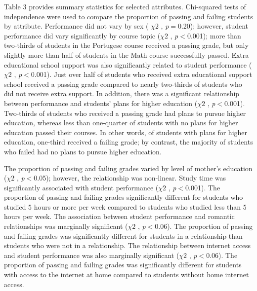 \documentclass[sigconf]{acmart}
\begin{document}
Table 3 provides summary statistics for selected attributes. Chi-squared tests 
of independence were used to compare the proportion of passing and failing 
students by attribute. Performance did not vary by sex ( $\chi 2$ , 
\textit{p}$=$0.20); however, student performance did vary significantly by 
course topic ($\chi 2$ , \textit{p}$<$0.001); more than two-thirds of students 
in the Portugese course received a passing grade, but only slightly more than 
half of students in the Math course successfully passed. Extra educational 
school support was also significantly related to student performance 
($\chi 2$ , \textit{p}$<$0.001). Just over half of students who received 
extra educational support school received a passing grade compared to nearly 
two-thirds of students who did not receive extra support. In addition, there 
was a significant relationship between performance and students' plans for 
higher education ($\chi 2$ , \textit{p}$<$0.001). Two-thirds of students 
who received a passing grade had plans to pursue higher education, whereas 
less than one-quarter of students with no plans for higher education passed 
their courses. In other words, of students with plans for higher education, 
one-third received a failing grade; by contrast, the majority of students who 
failed had no plans to pursue higher education. 


The proportion of passing and failing grades varied by level of mother's 
education ($\chi 2$ , \textit{p}$<$0.05); however, the relationship was 
non-linear. Study time was significantly associated with student performance 
($\chi 2$ , \textit{p}$<$0.001). The proportion of passing and failing 
grades significantly different for students who studied 5 hours or more 
per week compared to students who studied less than 5 hours per week. 
The association between student performance and romantic relationships
was marginally significant ($\chi 2$ , \textit{p}$<$0.06). The proportion 
of passing and failing grades was significantly different for students in 
a relationship than students who were not in a relationship. The relationship 
between internet access and student performance was also marginally significant 
($\chi 2$ , \textit{p}$<$0.06). The proportion of passing and failing grades 
was significantly different for students with access to the internet at home
compared to students without home internet access.

\end{document}

